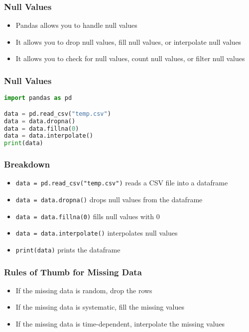 \documentclass[serif, 9pt, aspectratio=32]{beamer}
\begin{document}
\begin{frame}
    \centering
    \frametitle{Null Values}
    \begin{itemize}
        \setlength{\itemsep}{2em}
        \item Pandas allows you to handle null values
        \item It allows you to drop null values, fill null values, or interpolate null values
        \item It allows you to check for null values, count null values, or filter null values
    \end{itemize}
\end{frame}

\begin{frame}[fragile]
    \frametitle{Null Values}
    \begin{lstlisting}[language=Python]
import pandas as pd

data = pd.read_csv("temp.csv")
data = data.dropna()
data = data.fillna(0)
data = data.interpolate()
print(data)
    \end{lstlisting}
\end{frame}

\begin{frame}
    \centering
    \frametitle{Breakdown}
    \begin{itemize}
        \setlength{\itemsep}{2em}
        \item \texttt{data = pd.read\_csv("temp.csv")} reads a CSV file into a dataframe
        \item \texttt{data = data.dropna()} drops null values from the dataframe
        \item \texttt{data = data.fillna(0)} fills null values with 0
        \item \texttt{data = data.interpolate()} interpolates null values
        \item \texttt{print(data)} prints the dataframe
    \end{itemize}
\end{frame}

\begin{frame}
    \centering
    \frametitle{Rules of Thumb for Missing Data}
    \begin{itemize}
        \setlength{\itemsep}{2em}
        \item If the missing data is random, drop the rows
        \item If the missing data is systematic, fill the missing values
        \item If the missing data is time-dependent, interpolate the missing values
    \end{itemize}
\end{frame}
\end{document}
